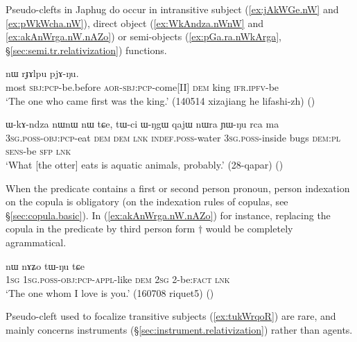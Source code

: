 Pseudo-clefts in Japhug do occur in intransitive subject (\ref{ex:jAkWGe.nW} and  \ref{ex:pWkWcha.nW}), direct object (\ref{ex:WkAndza.nWnW} and \ref{ex:akAnWrga.nW.nAZo}) or semi-objects (\ref{ex:pGa.ra.nWkArga}, §\ref{sec:semi.tr.relativization}) functions.

\begin{exe}
\ex \label{ex:jAkWGe.nW}
 nɯ rɟɤlpu pjɤ-ŋu.\\
most \textsc{sbj}:\textsc{pcp}-be.before \textsc{aor}-\textsc{sbj}:\textsc{pcp}-come[II] \textsc{dem} king \textsc{ifr}.\textsc{ipfv}-be\\
\glt `The one who came first was the king.' (140514 xizajiang he lifashi-zh)
()
\end{exe}

\begin{exe}
\ex \label{ex:WkAndza.nWnW}
\gll ɯ-kɤ-ndza nɯnɯ nɯ tɕe, tɯ-ci ɯ-ŋgɯ qajɯ nɯra ɲɯ-ŋu rca ma \\
\textsc{3sg}.\textsc{poss}-\textsc{obj}:\textsc{pcp}-eat \textsc{dem} \textsc{dem} \textsc{lnk} \textsc{indef}.\textsc{poss}-water \textsc{3sg}.\textsc{poss}-inside bugs \textsc{dem}:\textsc{pl} \textsc{sens}-be \textsc{sfp} \textsc{lnk} \\
\glt `What [the otter] eats is aquatic animals, probably.' (28-qapar)
()
\end{exe}

When the predicate contains a first or second person pronoun, person indexation on the copula is obligatory (on the indexation rules of copulas, see §\ref{sec:copula.basic}). In  (\ref{ex:akAnWrga.nW.nAZo}) for instance, replacing the copula in the predicate  by third person form $\dagger$ would be completely agrammatical.
 
\begin{exe}
\ex \label{ex:akAnWrga.nW.nAZo}
 nɯ nɤʑo tɯ-ŋu tɕe \\
\textsc{1sg} \textsc{1sg}.\textsc{poss}-\textsc{obj}:\textsc{pcp}-\textsc{appl}-like \textsc{dem} \textsc{2sg} 2-be:\textsc{fact} \textsc{lnk} \\
\glt `The one whom I love is you.' (160708 riquet5)
()
\end{exe}

Pseudo-cleft used to focalize transitive subjects (\ref{ex:tukWrqoR}) are rare, and mainly concerns instruments (§\ref{sec:instrument.relativization}) rather than agents.

